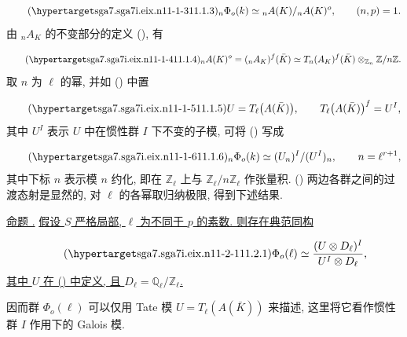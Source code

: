 \begin{equation}\tag{\SGARefTarget{sga7.sga7i.eix.n11-1-3}{11.1.3}}
{}_n\Phi_o(k)\simeq{}_nA(K)/{}_nA(K)^o,
 \qquad (n,p)=1.
\end{equation}
由 ${}_nA_K$ 的不变部分的定义 (), 有

\begin{equation}\tag{\SGARefTarget{sga7.sga7i.eix.n11-1-4}{11.1.4}}
{}_nA(K)^o=({}_nA_K)^f(\bar K)
 \simeq T_n(A_K)^f(\bar K)
 \otimes_{\mathbb Z_n}\mathbb Z/n\mathbb Z.
\end{equation}
取 $n$ 为 $\ell$ 的幂, 并如 () 中置

\begin{equation}\tag{\SGARefTarget{sga7.sga7i.eix.n11-1-5}{11.1.5}}
U=T_\ell\bigl(A(\bar K)\bigr),
 \qquad
T_\ell\bigl(A(\bar K)\bigr)^f=U^I,
\end{equation}
其中 $U^I$ 表示 $U$ 中在惯性群 $I$ 下不变的子模, 可将 () 写成

\begin{equation}\tag{\SGARefTarget{sga7.sga7i.eix.n11-1-6}{11.1.6}}
{}_n\Phi_o(k)\simeq (U_n)^I/(U^I)_n,
 \qquad n=\ell^{r+1},
\end{equation}
其中下标 $n$ 表示模 $n$ 约化, 即在 $\mathbb Z_\ell$ 上与 $\mathbb Z_\ell/n\mathbb Z_\ell$ 作张量积. () 两边各群之间的过渡态射是显然的, 对 $\ell$ 的各幂取归纳极限, 得到下述结果.

\medskip
\noindent
\underline{命题 .} \underline{假设 $S$ 严格局部, $\ell$ 为不同于 $p$ 的素数. 则存在典范同构}

\begin{equation}\tag{\SGARefTarget{sga7.sga7i.eix.n11-2-1}{11.2.1}}
\Phi_o(\ell)\simeq
 \frac{(U\otimes D_\ell)^I}{U^I\otimes D_\ell},
\end{equation}
\underline{其中 $U$ 在 () 中定义, 且 $D_\ell=\mathbb Q_\ell/\mathbb Z_\ell$.}

因而群 $\Phi_o(\ell)$ 可以仅用 Tate 模 $U=T_\ell(A(\bar K))$ 来描述, 这里将它看作惯性群 $I$ 作用下的 Galois 模.



